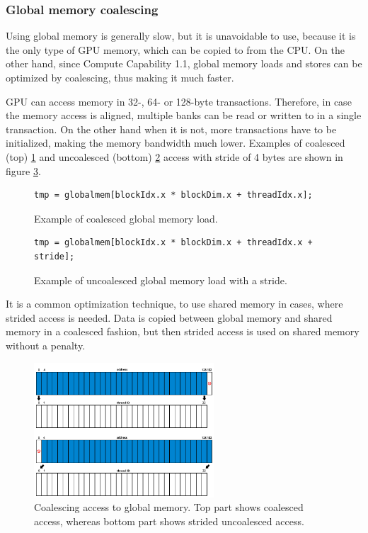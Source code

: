 \subsubsection{Global memory coalescing}\label{subsubsec:cuda-coalescing}

Using global memory is generally slow, but it is unavoidable to use, because it is the only type of GPU memory, which can be copied to from the CPU. On the other hand, since Compute Capability 1.1, global memory loads and stores can be optimized by coalescing, thus making it much faster.

GPU can access memory in 32-, 64- or 128-byte transactions. Therefore, in case the memory access is aligned, multiple banks can be read or written to in a single transaction. On the other hand when it is not, more transactions have to be initialized, making the memory bandwidth much lower. Examples of coalesced (top) \ref{code:coalesced} and uncoalesced (bottom) \ref{code:uncoalesced} access with stride of 4 bytes are shown in figure \ref{fig:coalescing}.

\begin{figure}[ht]
\begin{verbatim}
tmp = globalmem[blockIdx.x * blockDim.x + threadIdx.x];
\end{verbatim}
\caption{Example of coalesced global memory load.}\label{code:coalesced}
\end{figure}

\begin{figure}[ht]
\begin{verbatim}
tmp = globalmem[blockIdx.x * blockDim.x + threadIdx.x + stride];
\end{verbatim}
\caption{Example of uncoalesced global memory load with a stride.}\label{code:uncoalesced}
\end{figure}

It is a common optimization technique, to use shared memory in cases, where strided access is needed. Data is copied between global memory and shared memory in a coalesced fashion, but then strided access is used on shared memory without a penalty.

\FloatBarrier

\begin{center}
\begin{figure}[ht]
	\centering\includegraphics[width=0.6\textwidth]{fig/coalescing.png}
	\caption{Coalescing access to global memory. Top part shows coalesced access, whereas bottom part shows strided uncoalesced access.}\label{fig:coalescing}
\end{figure}
\end{center}

